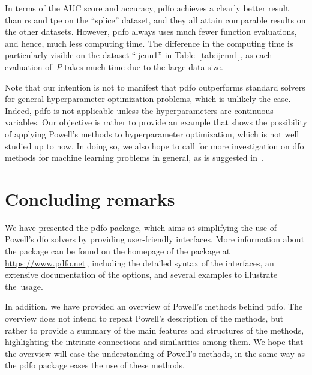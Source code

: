 \documentclass[
    smallextended,  %
    final,          %
]{svjour3}
\begin{document}
In terms of the AUC score and accuracy, \gls{pdfo} achieves a clearly better result than \gls{rs}
and \gls{tpe} on the ``splice'' dataset, and they all attain comparable results on the other datasets.
However, \gls{pdfo} always uses much fewer function evaluations, and hence, much less computing time.
The difference in the computing time is particularly visible on the dataset ``ijcnn1'' in
Table~\ref{tab:ijcnn1}, as each evaluation of~$P$ takes much time due to the large data size.

Note that our intention is not to manifest that \gls{pdfo} outperforms standard solvers for
general hyperparameter optimization problems, which is unlikely the case. Indeed, \gls{pdfo} is not
applicable unless the hyperparameters are continuous variables.
Our objective is rather to provide an
example that shows the possibility of applying Powell's methods to hyperparameter optimization, which is not well studied up to now.
In doing so, we also hope to call for more investigation on \gls{dfo} methods for
machine learning problems in general, as is suggested in~\cite{Ghanbari_Scheinberg_2017}.




\section{Concluding remarks}
\label{sec:conclude}

We have presented the \gls{pdfo} package, which aims at simplifying the use of
Powell's \gls{dfo} solvers by providing user-friendly interfaces.
More information about the package can be found on the homepage of the package at
\mbox{\url{https://www.pdfo.net}}\,, including the detailed syntax of the interfaces,
an extensive documentation of the options, and several examples to illustrate the~usage.

In addition, we have provided an overview of Powell's methods behind \gls{pdfo}.
The overview does not intend to repeat Powell's description of the methods, but rather to provide a
summary of the main features and structures of the methods, highlighting the intrinsic connections and
similarities among them. We hope that the overview will ease the understanding of Powell's methods,
in the same way as the \gls{pdfo} package eases the use of these methods.
\end{document}
